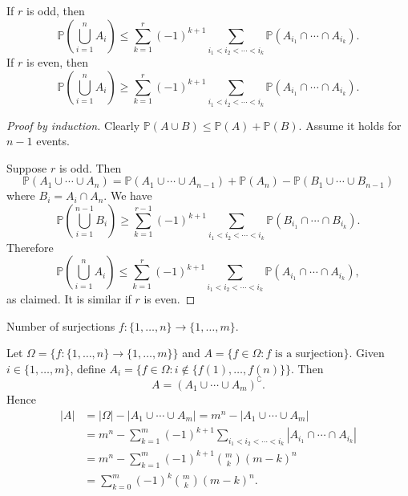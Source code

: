 \begin{proposition}\label{prop:Bonferroni inequalities}
    If $r$ is odd, then 
    \[
        \mathbb{P}\left( \bigcup_{i=1}^{n}A_i \right)\le \sum_{k=1}^{r}(-1)^{k+1} \sum_{i_1<i_2<\cdots<i_k}\mathbb{P}\left( A_{i_1}\cap \cdots \cap A_{i_k} \right).
    \]
    If $r$ is even, then 
    \[
        \mathbb{P}\left( \bigcup_{i=1}^{n}A_i \right)\ge \sum_{k=1}^{r}(-1)^{k+1} \sum_{i_1<i_2<\cdots<i_k}\mathbb{P}\left( A_{i_1}\cap \cdots \cap A_{i_k} \right).
    \]
\end{proposition}
\begin{proof}[Proof by induction]
    Clearly $ \mathbb{P}(A \cup B)\le \mathbb{P}(A)+\mathbb{P}(B) $. Assume it holds for $n-1$ events.

    Suppose $r$ is odd. Then 
    \[
        \mathbb{P}(A_1 \cup \cdots \cup A_n) = \mathbb{P}(A_1 \cup \cdots \cup A_{n-1})+\mathbb{P}(A_n)-\mathbb{P}(B_1 \cup \cdots \cup B_{n-1})
    \]
    where $ B_i=A_i\cap A_n $. We have 
    \[
        \mathbb{P}\left( \bigcup_{i=1}^{n-1}B_i \right)\ge \sum_{k=1}^{r-1}(-1)^{k+1} \sum_{i_1<i_2<\cdots<i_k}\mathbb{P}\left( B_{i_1}\cap \cdots \cap B_{i_k} \right).
    \]
    Therefore 
    \[
        \mathbb{P}\left( \bigcup_{i=1}^{n}A_i \right)\le \sum_{k=1}^{r}(-1)^{k+1} \sum_{i_1<i_2<\cdots<i_k}\mathbb{P}\left( A_{i_1}\cap \cdots \cap A_{i_k} \right),
    \]
    as claimed. It is similar if $r$ is even.
\end{proof}

\begin{example}
    Number of surjections $ f: \{1,\dots,n\}\to \{1,\dots,m\} $.

    Let $ \Omega = \{f: \{1,\dots,n\}\to \{1,\dots,m\}\} $ and $ A=\{f\in \Omega: f \text{ is a surjection}\} $. Given $ i\in \{1,\dots,m\} $, define $ A_i=\{f\in\Omega: i\notin \{f(1),\dots,f(n)\}\} $. Then 
    \[
        A = (A_1 \cup \cdots \cup A_m)^{\complement}.
    \]
    Hence 
    \begin{align*}
        |A|&= |\Omega|-|A_1 \cup \cdots \cup A_m|=m^n-|A_1 \cup \cdots \cup A_m|\\ 
        &= m^n-\sum_{k=1}^{m}(-1)^{k+1} \sum_{i_1<i_2<\cdots<i_k}\left| A_{i_1}\cap \cdots \cap A_{i_k} \right|\\ 
        &= m^n-\sum_{k=1}^{m}(-1)^{k+1} \binom{m}{k}(m-k)^n\\ 
        &= \sum_{k=0}^{m}(-1)^k \binom{m}{k}(m-k)^n.
    \end{align*}
\end{example}

